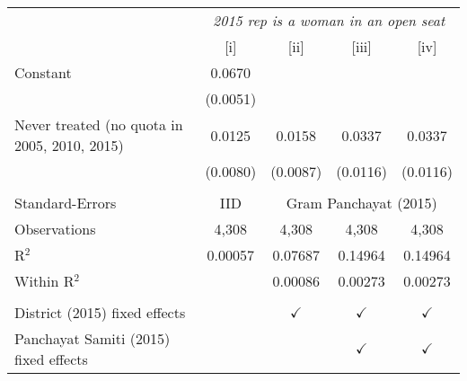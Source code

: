 
\begingroup
\centering
\begin{tabular}{lcccc}
   \toprule
    & \multicolumn{4}{c}{\textit{2015 rep is a woman in an open seat}}\\
                                                & [i]      & [ii]          & [iii]         & [iv]\\  
   \midrule 
   Constant                                     & 0.0670   &               &               &   \\   
                                                & (0.0051) &               &               &   \\   
   Never treated (no quota in 2005, 2010, 2015) & 0.0125   & 0.0158        & 0.0337        & 0.0337\\   
                                                & (0.0080) & (0.0087)      & (0.0116)      & (0.0116)\\   
    \\
   Standard-Errors & IID & \multicolumn{3}{c}{Gram Panchayat (2015)} \\ 
   Observations                                 & 4,308    & 4,308         & 4,308         & 4,308\\  
   R$^2$                                        & 0.00057  & 0.07687       & 0.14964       & 0.14964\\  
   Within R$^2$                                 &          & 0.00086       & 0.00273       & 0.00273\\  
    \\
   District (2015) fixed effects                &          & $\checkmark$  & $\checkmark$  & $\checkmark$\\   
   Panchayat Samiti (2015) fixed effects        &          &               & $\checkmark$  & $\checkmark$\\   
   \bottomrule
\end{tabular}
\par\endgroup


